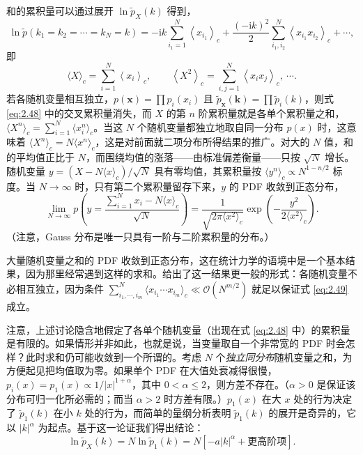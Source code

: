 和的累积量可以通过展开 $\ln\tilde p_X(k)$ 得到，
\begin{equation}\label{eq:2.47}
  \ln\tilde p\left(k_1=k_2=\cdots=k_N=k\right)=-\mathrm{i}k\sum_{i_1=1}^{N}\left\langle x_{i_1}\right\rangle_c+\frac{(-\mathrm{i}k)^2}{2}\sum_{i_1,i_2}^{N}\left\langle x_{i_1}x_{i_2}\right\rangle_c+\cdots,
\end{equation}
即
\begin{equation}\label{eq:2.48}
  \langle X\rangle_c=\sum_{i=1}^{N}\left\langle x_i\right\rangle_c,\qquad \left\langle X^2\right\rangle_c=\sum_{i,j=1}^{N}\left\langle x_ix_j\right\rangle_c,\ \cdots.
\end{equation}
若各随机变量相互独立，$p(\bm{x})=\prod p_i(x_i)$ 且 $\tilde p_{\bm{x}}(\bm{k})=\prod\tilde p_i(k)$，则式 \eqref{eq:2.48} 中的交叉累积量消失，而 $X$ 的第 $n$ 阶累积量就是各单个累积量之和，$\langle X^n\rangle_c=\sum_{i=1}^{N}\langle x_i^n\rangle_c$。当这 $N$ 个随机变量都独立地取自同一分布 $p(x)$ 时，这意味着 $\langle X^n\rangle_c=N\langle x^n\rangle_c$，这是对前面就二项分布所得结果的推广。对大的 $N$ 值，和的平均值正比于 $N$，而围绕均值的涨落——由标准偏差衡量——只按 $\sqrt{N}$ 增长。随机变量 $y=(X-N\langle x\rangle_c)/\sqrt{N}$ 具有零均值，其累积量按 $\langle y^n\rangle_c\propto N^{1-n/2}$ 标度。当 $N\to\infty$ 时，只有第二个累积量留存下来，$y$ 的 PDF 收敛到正态分布，
\begin{equation}\label{eq:2.49}
  \lim_{N\to\infty}p\left(y=\frac{\sum_{i=1}^{N}x_i-N\langle x\rangle_c}{\sqrt{N}}\right)=\frac{1}{\sqrt{2\pi\langle x^2\rangle_c}}\exp\left(-\frac{y^2}{2\langle x^2\rangle_c}\right).
\end{equation}
（注意，Gauss 分布是唯一只具有一阶与二阶累积量的分布。）

大量随机变量之和的 PDF 收敛到正态分布，这在统计力学的语境中是一个基本结果，因为那里经常遇到这样的求和。给出了这一结果更一般的形式：各随机变量不必相互独立，因为条件 $\sum_{i_1,\cdots,i_m}^{N}\langle x_{i_1}\cdots x_{i_m}\rangle_c\ll\mathcal{O}(N^{m/2})$ 就足以保证式 \eqref{eq:2.49} 成立。

注意，上述讨论隐含地假定了各单个随机变量（出现在式 \eqref{eq:2.48} 中）的累积量是有限的。如果情形并非如此，也就是说，当变量取自一个非常宽的 PDF 时会怎样？此时求和仍可能收敛到一个所谓的。考虑 $N$ 个\emph{独立同分布}随机变量之和，为方便起见把均值取为零。如果单个 PDF 在大值处衰减得很慢，$p_i(x)=p_1(x)\propto1/|x|^{1+\alpha}$，其中 $0<\alpha\le2$，则方差不存在。（$\alpha>0$ 是保证该分布可归一化所必需的；而当 $\alpha>2$ 时方差有限。）$p_1(x)$ 在大 $x$ 处的行为决定了 $\tilde p_1(k)$ 在小 $k$ 处的行为，而简单的量纲分析表明 $\tilde p_1(k)$ 的展开是奇异的，它以 $|k|^\alpha$ 为起点。基于这一论证我们得出结论：
\begin{equation}\label{eq:2.50}
  \ln\tilde p_X(k)=N\ln\tilde p_1(k)=N\left[-a|k|^{\alpha}+\text{更高阶项}\right].
\end{equation}

